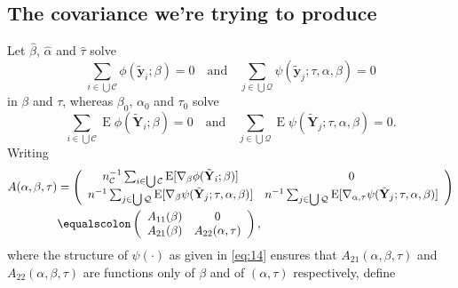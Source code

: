 \documentclass{article}
\newcommand{\eqdef}{\ensuremath{\equalscolon}}
\newcommand{\EE}{\operatorname{E}}
\begin{document}
\subsection{The covariance we're trying to
  produce}\label{sec:covar-were-trying}

Let $\hat\beta$, $\hat\alpha$ and $\hat\tau$ solve
\[\sum_{i\in \bigcup \mathcal{C}}\phi(\tilde{\mathbf{y}}_{i}; \beta )
  =0\quad\text{and}\quad
\sum_{j\in \bigcup \mathcal{Q}}\psi(\tilde{\mathbf{y}}_{j}; \tau,
\alpha, \beta )  =0
  \]
  in $\beta$ and $\tau$, whereas $\beta_{0}$, $\alpha_{0}$ and $\tau_{0}$ solve 
\[\sum_{i\in \bigcup \mathcal{C}}\EE\phi(\tilde{\mathbf{Y}}_{i}; \beta )
  =0\quad\text{and}\quad
\sum_{j\in \bigcup \mathcal{Q}}\EE\psi(\tilde{\mathbf{Y}}_{j}; \tau,
\alpha, \beta )  =0.
  \]
  Writing
  \begin{align*}
    A(\alpha, \beta, \tau) &= \left(
      \begin{array}{cc}
        n_{\mathcal{C}}^{-1}\sum_{i\in \bigcup
        \mathcal{C}}\EE [\nabla_{\beta}\phi(\tilde{\mathbf{Y}}_{i};
        \beta )]&0\\
        n^{-1}\sum_{j\in \bigcup
        \mathcal{Q}}\EE[ \nabla_{\beta}\psi(\tilde{\mathbf{Y}}_{j};
        \tau, \alpha, \beta )]  & n^{-1}\sum_{j\in \bigcup
        \mathcal{Q}}\EE[ \nabla_{\alpha, \tau}\psi(\tilde{\mathbf{Y}}_{j};
        \tau, \alpha, \beta )]
      \end{array}
    \right)\\
    &\eqdef \left(
      \begin{array}{cc}
        A_{11}(\beta)& 0\\
        A_{21}(\beta) & A_{22}(\alpha, \tau)
      \end{array}
\right),
  \end{align*}
where the structure of $\psi(\cdot)$ as given in \eqref{eq:14} ensures
that $A_{21}(\alpha, \beta, \tau)$ and $A_{22}(\alpha, \beta, \tau)$ are functions only of $\beta$ and of $(\alpha, \tau)$ respectively,
  define 
\end{document}
